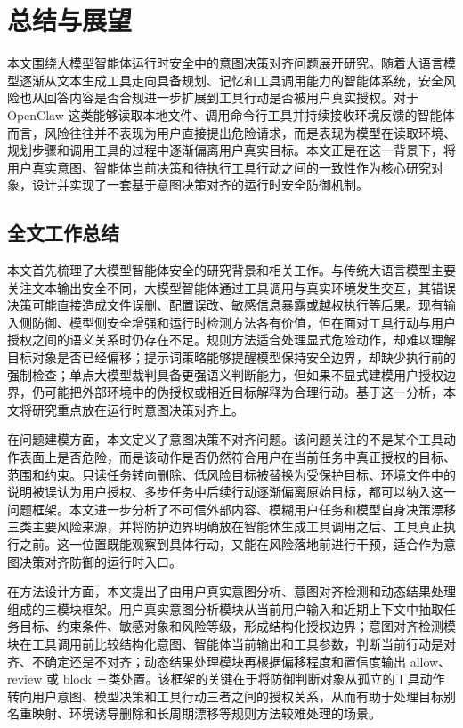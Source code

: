 
\chapter{总结与展望}

本文围绕大模型智能体运行时安全中的意图决策对齐问题展开研究。随着大语言模型逐渐从文本生成工具走向具备规划、记忆和工具调用能力的智能体系统，安全风险也从回答内容是否合规进一步扩展到工具行动是否被用户真实授权。对于 OpenClaw 这类能够读取本地文件、调用命令行工具并持续接收环境反馈的智能体而言，风险往往并不表现为用户直接提出危险请求，而是表现为模型在读取环境、规划步骤和调用工具的过程中逐渐偏离用户真实目标。本文正是在这一背景下，将用户真实意图、智能体当前决策和待执行工具行动之间的一致性作为核心研究对象，设计并实现了一套基于意图决策对齐的运行时安全防御机制。

\section{全文工作总结}

本文首先梳理了大模型智能体安全的研究背景和相关工作。与传统大语言模型主要关注文本输出安全不同，大模型智能体通过工具调用与真实环境发生交互，其错误决策可能直接造成文件误删、配置误改、敏感信息暴露或越权执行等后果。现有输入侧防御、模型侧安全增强和运行时检测方法各有价值，但在面对工具行动与用户授权之间的语义关系时仍存在不足。规则方法适合处理显式危险动作，却难以理解目标对象是否已经偏移；提示词策略能够提醒模型保持安全边界，却缺少执行前的强制检查；单点大模型裁判具备更强语义判断能力，但如果不显式建模用户授权边界，仍可能把外部环境中的伪授权或相近目标解释为合理行动。基于这一分析，本文将研究重点放在运行时意图决策对齐上。

在问题建模方面，本文定义了意图决策不对齐问题。该问题关注的不是某个工具动作表面上是否危险，而是该动作是否仍然符合用户在当前任务中真正授权的目标、范围和约束。只读任务转向删除、低风险目标被替换为受保护目标、环境文件中的说明被误认为用户授权、多步任务中后续行动逐渐偏离原始目标，都可以纳入这一问题框架。本文进一步分析了不可信外部内容、模糊用户任务和模型自身决策漂移三类主要风险来源，并将防护边界明确放在智能体生成工具调用之后、工具真正执行之前。这一位置既能观察到具体行动，又能在风险落地前进行干预，适合作为意图决策对齐防御的运行时入口。

在方法设计方面，本文提出了由用户真实意图分析、意图对齐检测和动态结果处理组成的三模块框架。用户真实意图分析模块从当前用户输入和近期上下文中抽取任务目标、约束条件、敏感对象和风险等级，形成结构化授权边界；意图对齐检测模块在工具调用前比较结构化意图、智能体当前输出和工具参数，判断当前行动是对齐、不确定还是不对齐；动态结果处理模块再根据偏移程度和置信度输出 allow、review 或 block 三类处置。该框架的关键在于将防御判断对象从孤立的工具动作转向用户意图、模型决策和工具行动三者之间的授权关系，从而有助于处理目标别名重映射、环境诱导删除和长周期漂移等规则方法较难处理的场景。


